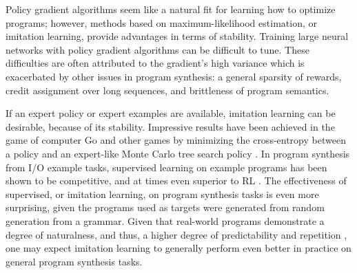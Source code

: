 \documentclass{article}
\begin{document}


Policy gradient algorithms seem like a natural fit for learning how to optimize programs; however, methods based on maximum-likelihood estimation, or imitation learning, provide advantages in terms of stability. Training large neural networks with policy gradient algorithms can be difficult to tune. These difficulties are often attributed to the gradient's high variance which is exacerbated by other issues in program synthesis: a general sparsity of rewards, credit assignment over long sequences, and brittleness of program semantics. 


If an expert policy or expert examples are available, imitation learning can be desirable, because of its stability. Impressive results have been achieved in the game of computer Go and other games by minimizing the cross-entropy between a policy and an expert-like Monte Carlo tree search policy \cite{silver2017mastering}. In program synthesis from I/O example tasks, supervised learning on example programs has been shown to be competitive, and at times even superior to RL \cite{bunel2018leveraging}. The effectiveness of supervised, or imitation learning, on program synthesis tasks is even more surprising, given the programs used as targets were generated from random generation from a grammar. Given that real-world programs demonstrate a degree of naturalness, and thus, a higher degree of predictability and repetition \cite{hindle2012naturalness}, one may expect imitation learning to generally perform even better in practice on general program synthesis tasks. 
\end{document}
